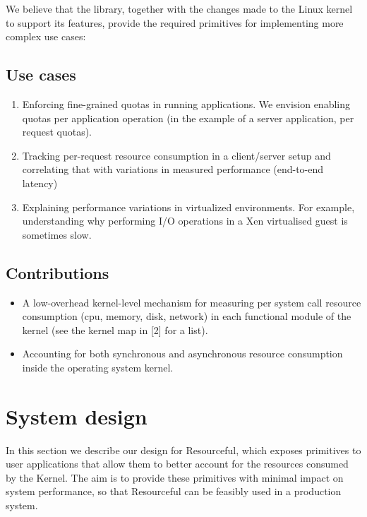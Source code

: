 \documentclass[12pt]{article}
\begin{document}
We believe that the library, together with the changes made to the Linux kernel to support its features, provide the required primitives for implementing more complex use cases:

\subsection{Use cases}
\begin{enumerate}
\item Enforcing fine-grained quotas in running applications. We envision enabling quotas per application operation (in the example of a server application, per request quotas).
\item Tracking per-request resource consumption in a client/server setup and correlating that with variations in measured performance (end-to-end latency)
\item Explaining performance variations in virtualized environments. For example, understanding why performing I/O operations in a Xen virtualised guest is sometimes slow.
\end{enumerate}


\subsection{Contributions}
\begin{itemize}
\item A low-overhead kernel-level mechanism for measuring per system call resource consumption (cpu, memory, disk, network) in each functional module of the kernel (see the kernel map in [2] for a list).
\item Accounting for both synchronous and asynchronous resource consumption inside the operating system kernel.
\end{itemize}


\section{System design}
In this section we describe our design for Resourceful, which exposes primitives to user applications that allow them to better account for the resources consumed by the Kernel. 
The aim is to provide these primitives with minimal impact on system performance, so that Resourceful can be feasibly used in a production system.
\end{document}
